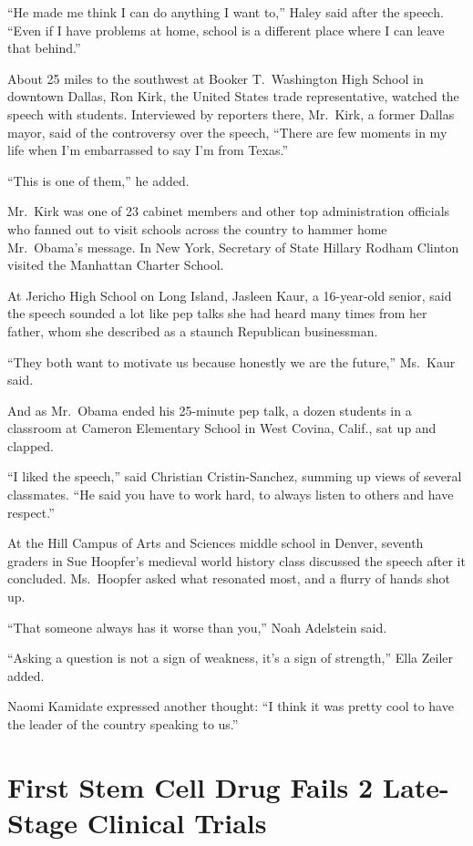 ﻿\documentclass[12pt]{article}
\begin{document}
``He made me think I can do anything I want to,'' Haley said after the speech. ``Even if I have
problems at home, school is a different place where I can leave that behind.''

About 25 miles to the southwest at Booker T.~Washington High School in downtown Dallas, Ron Kirk,
the United States trade representative, watched the speech with students. Interviewed by reporters
there, Mr.~Kirk, a former Dallas mayor, said of the controversy over the speech, ``There are few
moments in my life when I'm embarrassed to say I'm from Texas.''

``This is one of them,'' he added.

Mr.~Kirk was one of 23 cabinet members and other top administration officials who fanned out to
visit schools across the country to hammer home Mr.~Obama's message. In New York, Secretary of State
Hillary Rodham Clinton visited the Manhattan Charter School.

At Jericho High School on Long Island, Jasleen Kaur, a 16-year-old senior, said the speech sounded a
lot like pep talks she had heard many times from her father, whom she described as a staunch
Republican businessman.

``They both want to motivate us because honestly we are the future,'' Ms.~Kaur said.

And as Mr.~Obama ended his 25-minute pep talk, a dozen students in a classroom at Cameron Elementary
School in West Covina, Calif., sat up and clapped.

``I liked the speech,'' said Christian Cristin-Sanchez, summing up views of several classmates. ``He
said you have to work hard, to always listen to others and have respect.''

At the Hill Campus of Arts and Sciences middle school in Denver, seventh graders in Sue Hoopfer's
medieval world history class discussed the speech after it concluded. Ms.~Hoopfer asked what
resonated most, and a flurry of hands shot up.

``That someone always has it worse than you,'' Noah Adelstein said.

``Asking a question is not a sign of weakness, it's a sign of strength,'' Ella Zeiler added.

Naomi Kamidate expressed another thought: ``I think it was pretty cool to have the leader of the
country speaking to us.''

\section{First Stem Cell Drug Fails 2 Late-Stage Clinical Trials}
\end{document}
